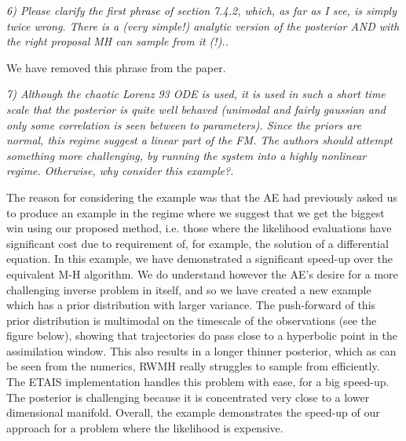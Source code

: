 \documentclass{article}
\newcommand{\comment}[2]{\vspace{0.6cm}{\bf Comment:} {\it #1.}

\vspace{0.3cm}{\bf Answer:} #2}
\begin{document}
\comment{6) Please clarify the first phrase of section 7.4.2, which, as far as I see, is simply twice wrong. There is a (very simple!) analytic version of the posterior AND with the right proposal MH can sample from it (!).}{We have removed this phrase from the paper.}

\comment{7) Although the chaotic Lorenz 93 ODE is used, it is used in such a short time scale that the posterior is quite well behaved (unimodal and fairly gaussian and only some correlation is seen between to parameters). Since the priors are normal, this regime suggest a linear part of the FM. The authors should attempt something more challenging, by running the system into a highly nonlinear regime. Otherwise, why consider this example?}{The reason for considering the example was that the AE had previously asked us to produce an example in the regime where we suggest that we get the biggest win using our proposed method, i.e. those where the likelihood evaluations have significant cost due to requirement of, for example, the solution of a differential equation. In this example, we have demonstrated a significant speed-up over the equivalent M-H algorithm. We do understand however the AE's desire for a more challenging inverse problem in itself, and so we have created a new example which has a prior distribution with larger variance. The push-forward of this prior distribution is multimodal on the timescale of the observations (see the figure below), showing that trajectories do pass close to a hyperbolic point in the assimilation window. This also results in a longer thinner posterior, which as can be seen from the numerics, RWMH really struggles to sample from efficiently. The ETAIS implementation handles this problem with ease, for a big speed-up. The posterior is challenging because it is concentrated very close to a lower dimensional manifold. Overall, the example demonstrates the speed-up of our approach for a problem where the likelihood is expensive.

}
\end{document}
